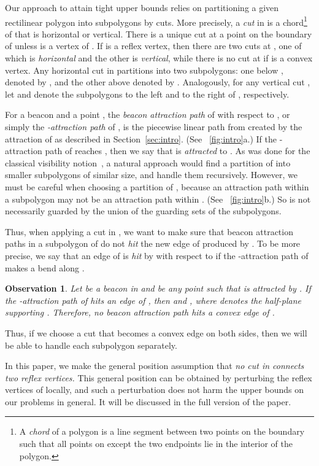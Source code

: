 \documentclass[11pt]{article}
\newtheorem{observation}{Observation}
\theoremstyle{definition}
\begin{document}
Our approach to attain  tight upper bounds relies on
partitioning a given rectilinear polygon  into subpolygons by cuts.
More precisely, a \emph{cut} in  is a chord\footnote{A \emph{chord}  of a polygon is a line segment between two points on the boundary
such that all points on  except the two endpoints lie in the interior of the polygon.}
of  that is horizontal or vertical.
There is a unique cut at a point  on the boundary  of 
unless  is a vertex of .
If  is a reflex vertex, then there are two cuts at ,
one of which is \emph{horizontal} and the other is \emph{vertical},
while there is no cut at  if  is a convex vertex.
Any horizontal cut  in  partitions  into two subpolygons:
one below , denoted by , and the other above  denoted by .
Analogously, for any vertical cut ,
let  and  denote the subpolygons to the left and to the right of , respectively.

For a beacon  and a point , the \emph{beacon attraction path} of  with respect to ,
or simply the \emph{-attraction path} of ,
is the piecewise linear path from  created by the attraction of 
as described in Section~\ref{sec:intro}.
(See \figurename~\ref{fig:intro}a.)
If the -attraction path of  reaches , then we say that  is \emph{attracted} to .
As was done for the classical visibility notion~\cite{o-apragt-83,ghks-ggprp-96},
a natural approach would find a partition of  into smaller subpolygons of similar size,
and handle them recursively.
However, we must be careful when choosing a partition of , because
an attraction path within a subpolygon may not be an attraction path
within . (See \figurename~\ref{fig:intro}b.)
So  is not necessarily guarded by the union of the guarding sets of the subpolygons.

Thus, when applying a cut in , we want to make sure that
beacon attraction paths in a subpolygon  of  do not \emph{hit} the new edge
of  produced by .
To be more precise, we say that an edge  of  is \emph{hit} by  with respect to 
if the -attraction path of  makes a bend along .
\begin{observation} \label{obs:convex_edge}
 Let  be a beacon in  and  be any point
 such that  is attracted by .
 If the -attraction path of  hits an edge  of ,
 then  and , where  denotes the half-plane supporting .
 Therefore, no beacon attraction path hits a convex edge of .
\end{observation}
Thus, if we choose a cut that becomes a convex edge on both sides,
then we will be able to handle each subpolygon separately.

In this paper, we make the  general position assumption 
that \textit{no cut in  connects two reflex vertices.}
This general position can be obtained by perturbing the reflex vertices of  locally,
and such a perturbation does not harm the upper bounds on our problems in general.
It will be discussed in the full version of the paper.
\end{document}
